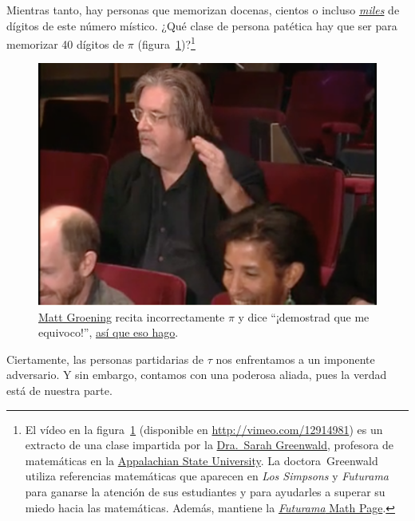 Mientras tanto, hay personas que memorizan docenas, cientos o incluso  \href{https://www.guinnessworldrecords.com/world-records/most-pi-places-memorised}{\emph{miles}} de dígitos de este número místico. ¿Qué clase de persona patética hay que ser para memorizar 40 dígitos de $\pi$ (figura~\ref{fig:futurama_video})?\footnote{El vídeo en la figura~\ref{fig:futurama_video} (disponible en  \href{http://vimeo.com/12914981}{http://vimeo.com/12914981}) es un extracto de una clase impartida por la \href{https://cs.appstate.edu/~sjg/}{Dra.\ Sarah Greenwald}, profesora de matemáticas en la \href{http://www.appstate.edu/}{Appalachian State University}. La doctora\ Greenwald utiliza referencias matemáticas que aparecen en \emph{Los Simpsons} y \emph{Futurama} para ganarse la atención de sus estudiantes y para ayudarles a superar su miedo hacia las matemáticas. Además, mantiene la \href{http://mathsci2.appstate.edu/~sjg/futurama/}{\emph{Futurama} Math Page}.}

\begin{figure}
\begin{center}
\includegraphics{images/figures/futurama_math_lecture.png} %
\end{center}
\caption{\href{https://es.wikipedia.org/wiki/Matt_Groening}{Matt Groening} recita incorrectamente $\pi$ y dice  ``¡demostrad que me equivoco!'', \href{https://vimeo.com/12914981}{así que eso hago}.\label{fig:futurama_video}}
\end{figure}

Ciertamente, las personas partidarias de $\tau$ nos enfrentamos a un imponente adversario. Y sin embargo, contamos con una poderosa aliada, pues la verdad está de nuestra parte.

